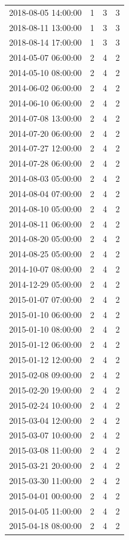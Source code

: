 \begin{tabular}{lrrr}
2018-08-05 14:00:00 & 1 & 3 & 3 \\
2018-08-11 13:00:00 & 1 & 3 & 3 \\
2018-08-14 17:00:00 & 1 & 3 & 3 \\
2014-05-07 06:00:00 & 2 & 4 & 2 \\
2014-05-10 08:00:00 & 2 & 4 & 2 \\
2014-06-02 06:00:00 & 2 & 4 & 2 \\
2014-06-10 06:00:00 & 2 & 4 & 2 \\
2014-07-08 13:00:00 & 2 & 4 & 2 \\
2014-07-20 06:00:00 & 2 & 4 & 2 \\
2014-07-27 12:00:00 & 2 & 4 & 2 \\
2014-07-28 06:00:00 & 2 & 4 & 2 \\
2014-08-03 05:00:00 & 2 & 4 & 2 \\
2014-08-04 07:00:00 & 2 & 4 & 2 \\
2014-08-10 05:00:00 & 2 & 4 & 2 \\
2014-08-11 06:00:00 & 2 & 4 & 2 \\
2014-08-20 05:00:00 & 2 & 4 & 2 \\
2014-08-25 05:00:00 & 2 & 4 & 2 \\
2014-10-07 08:00:00 & 2 & 4 & 2 \\
2014-12-29 05:00:00 & 2 & 4 & 2 \\
2015-01-07 07:00:00 & 2 & 4 & 2 \\
2015-01-10 06:00:00 & 2 & 4 & 2 \\
2015-01-10 08:00:00 & 2 & 4 & 2 \\
2015-01-12 06:00:00 & 2 & 4 & 2 \\
2015-01-12 12:00:00 & 2 & 4 & 2 \\
2015-02-08 09:00:00 & 2 & 4 & 2 \\
2015-02-20 19:00:00 & 2 & 4 & 2 \\
2015-02-24 10:00:00 & 2 & 4 & 2 \\
2015-03-04 12:00:00 & 2 & 4 & 2 \\
2015-03-07 10:00:00 & 2 & 4 & 2 \\
2015-03-08 11:00:00 & 2 & 4 & 2 \\
2015-03-21 20:00:00 & 2 & 4 & 2 \\
2015-03-30 11:00:00 & 2 & 4 & 2 \\
2015-04-01 00:00:00 & 2 & 4 & 2 \\
2015-04-05 11:00:00 & 2 & 4 & 2 \\
2015-04-18 08:00:00 & 2 & 4 & 2 \\

\end{tabular}
